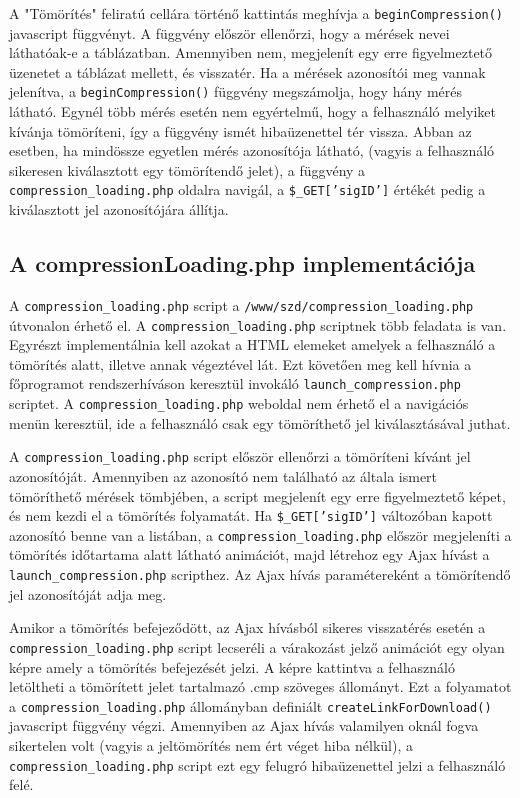 \documentclass[oneside,titlepage,12pt,a4paper]{report}
\begin{document}
\par A "Tömörítés" feliratú cellára történő kattintás meghívja a \texttt{beginCompression()} javascript függvényt. A függvény először ellenőrzi, hogy a mérések nevei láthatóak-e a táblázatban. Amennyiben nem, megjelenít egy erre figyelmeztető üzenetet a táblázat mellett, és visszatér. Ha a mérések azonosítói meg vannak jelenítva, a \texttt{beginCompression()} függvény megszámolja, hogy hány mérés látható. Egynél több mérés esetén nem egyértelmű, hogy a felhasználó melyiket kívánja tömöríteni, így a függvény ismét hibaüzenettel tér vissza. Abban az esetben, ha mindössze egyetlen mérés azonosítója látható, (vagyis a felhasználó sikeresen kiválasztott egy tömörítendő jelet), a függvény a \texttt{compression\_loading.php} oldalra navigál, a \texttt{\$\_GET['sigID']} értékét pedig a kiválasztott jel azonosítójára állítja.   

\subsection{A compressionLoading.php implementációja}

A \texttt{compression\_loading.php} script a \texttt{/www/szd/compression\_loading.php} útvonalon érhető el. A \texttt{compression\_loading.php} scriptnek több feladata is van. Egyrészt implementálnia kell azokat a HTML elemeket amelyek a felhasználó a tömörítés alatt, illetve annak végeztével lát. Ezt követően meg kell hívnia a főprogramot rendszerhíváson keresztül invokáló \texttt{launch\_compression.php} scriptet. A \texttt{compression\_loading.php} weboldal nem érhető el a navigációs menün keresztül, ide a felhasználó csak egy tömöríthető jel kiválasztásával juthat. 
\par A \texttt{compression\_loading.php} script először ellenőrzi a tömöríteni kívánt jel azonosítóját. Amennyiben az azonosító nem található az általa ismert tömöríthető mérések tömbjében, a script megjelenít egy erre figyelmeztető képet, és nem kezdi el a tömörítés folyamatát. Ha \texttt{\$\_GET['sigID']} változóban kapott azonosító benne van a listában, a \texttt{compression\_loading.php} először megjeleníti a tömörítés időtartama alatt látható animációt, majd létrehoz egy Ajax hívást a \texttt{launch\_compression.php} scripthez. Az Ajax hívás paramétereként a tömörítendő jel azonosítóját adja meg. 
\par Amikor a tömörítés befejeződött, az Ajax hívásból sikeres visszatérés esetén a \texttt{compression\_loading.php} script lecseréli a várakozást jelző animációt egy olyan képre amely a tömörítés befejezését jelzi. A képre kattintva a felhasználó letöltheti a tömörített jelet tartalmazó .cmp szöveges állományt. Ezt a folyamatot a \texttt{compression\_loading.php} állományban definiált \texttt{createLinkForDownload()} javascript függvény végzi. Amennyiben az Ajax hívás valamilyen oknál fogva sikertelen volt (vagyis a jeltömörítés nem ért véget hiba nélkül), a \texttt{compression\_loading.php} script ezt egy felugró hibaüzenettel jelzi a felhasználó felé.
\end{document}
